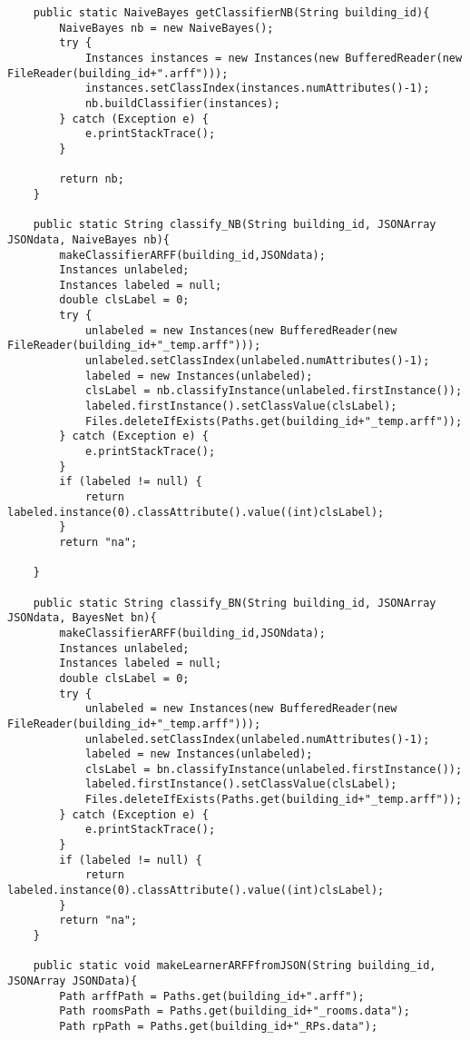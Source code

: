 \documentclass{article}
\begin{document}
\begin{lstlisting}
    public static NaiveBayes getClassifierNB(String building_id){
        NaiveBayes nb = new NaiveBayes();
        try {
            Instances instances = new Instances(new BufferedReader(new FileReader(building_id+".arff")));
            instances.setClassIndex(instances.numAttributes()-1);
            nb.buildClassifier(instances);
        } catch (Exception e) {
            e.printStackTrace();
        }

        return nb;
    }

    public static String classify_NB(String building_id, JSONArray JSONdata, NaiveBayes nb){
        makeClassifierARFF(building_id,JSONdata);
        Instances unlabeled;
        Instances labeled = null;
        double clsLabel = 0;
        try {
            unlabeled = new Instances(new BufferedReader(new FileReader(building_id+"_temp.arff")));
            unlabeled.setClassIndex(unlabeled.numAttributes()-1);
            labeled = new Instances(unlabeled);
            clsLabel = nb.classifyInstance(unlabeled.firstInstance());
            labeled.firstInstance().setClassValue(clsLabel);
            Files.deleteIfExists(Paths.get(building_id+"_temp.arff"));
        } catch (Exception e) {
            e.printStackTrace();
        }
        if (labeled != null) {
            return labeled.instance(0).classAttribute().value((int)clsLabel);
        }
        return "na";

    }

    public static String classify_BN(String building_id, JSONArray JSONdata, BayesNet bn){
        makeClassifierARFF(building_id,JSONdata);
        Instances unlabeled;
        Instances labeled = null;
        double clsLabel = 0;
        try {
            unlabeled = new Instances(new BufferedReader(new FileReader(building_id+"_temp.arff")));
            unlabeled.setClassIndex(unlabeled.numAttributes()-1);
            labeled = new Instances(unlabeled);
            clsLabel = bn.classifyInstance(unlabeled.firstInstance());
            labeled.firstInstance().setClassValue(clsLabel);
            Files.deleteIfExists(Paths.get(building_id+"_temp.arff"));
        } catch (Exception e) {
            e.printStackTrace();
        }
        if (labeled != null) {
            return labeled.instance(0).classAttribute().value((int)clsLabel);
        }
        return "na";
    }

    public static void makeLearnerARFFfromJSON(String building_id, JSONArray JSONData){
        Path arffPath = Paths.get(building_id+".arff");
        Path roomsPath = Paths.get(building_id+"_rooms.data");
        Path rpPath = Paths.get(building_id+"_RPs.data");


\end{lstlisting}
\end{document}
